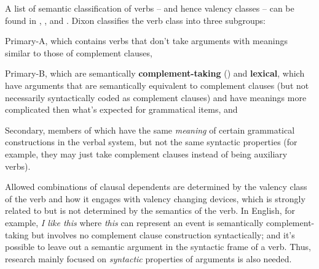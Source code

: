 \documentclass[a4paper, oneside]{report}
\newcommand*{\citesec}[1]{\S~{#1}}
\newcommand*{\concept}[1]{\textbf{#1}}
\newcommand{\form}[1]{\emph{#1}}
\begin{document}
A list of semantic classification of verbs -- 
and hence valency classes -- can be found in 
\citet[Part B]{dixon2005semantic},
\citet[\citesec{18.5}]{dixon2010basic2},
and \citet[\citesec{3.3}]{dixon2009basic1}.
Dixon classifies the verb class into three subgroups:
\begin{enumerate*}
    \item Primary-A, which contains verbs that 
    don't take arguments with meanings similar to those of complement clauses,
    \item Primary-B, which are semantically \concept{complement-taking} () 
    and \concept{lexical},
    which have arguments that are semantically equivalent to complement clauses 
    (but not necessarily syntactically coded as complement clauses)
    and have meanings more complicated then what's expected for grammatical items, and 
    \item Secondary, members of which have the same \emph{meaning} 
    of certain grammatical constructions in the verbal system,
    but not the same syntactic properties
    (for example, they may just take complement clauses instead of being auxiliary verbs).
\end{enumerate*}

Allowed combinations of clausal dependents are determined 
by the valency class of the verb and how it engages with valency changing devices,
which is strongly related to but is not determined by the semantics of the verb.
In English, for example, \form{I like this} 
where \form{this} can represent an event 
is semantically complement-taking 
but involves no complement clause construction syntactically;
and it's possible to leave out a semantic argument in the syntactic frame of a verb.
Thus, research mainly focused on \emph{syntactic} properties of arguments is also needed.
\end{document}
